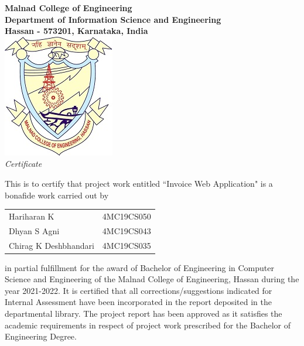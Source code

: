 \newpage

\thispagestyle{empty}

\thisfancypage{%
  \setlength{\fboxsep}{10pt}\doublebox}{}
	
\vspace*{1\baselineskip}
\begin{center}

\LARGE{\textbf{Malnad College of Engineering}} \\ 
\large{\textbf{Department of Information Science and Engineering}}\\
\large{\textbf{Hassan - 573201, Karnataka, India}}\\[0.5cm]

\includegraphics[scale=0.5]{mce_logo.png}\\[0.5cm]

\emph{\LARGE Certificate}\\[1cm]
\end{center}

\normalsize This is to certify that project work entitled ``Invoice Web Application" is a bonafide work carried out by 
\begin{table}[h]
\centering
\begin{tabular}{lr}
Hariharan K & 4MC19CS050 \\
Dhyan S Agni & 4MC19CS043 \\ 
Chirag K Deshbhandari & 4MC19CS035 \\
\end{tabular}
\end{table}
in partial fulfillment for the award of  Bachelor of Engineering in Computer Science and Engineering of the Malnad College of Engineering, Hassan during the year 2021-2022.  It is certified that all corrections/suggestions indicated for Internal Assessment have been incorporated in the report deposited in the departmental library. The project report has been approved as it satisfies the academic requirements in respect of project work prescribed for the Bachelor of Engineering Degree. \\[1.0cm]

